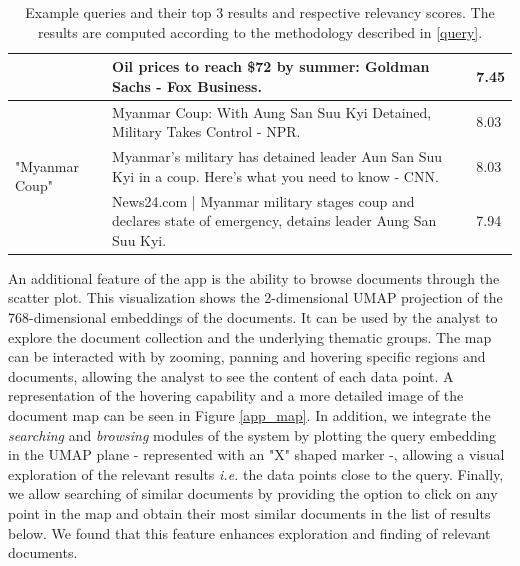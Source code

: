 \documentclass[a4paper]{article}
\begin{document}
\begin{table}[H]
{\begin{tabularx}{\linewidth}{lXl}
			                                          & Oil prices to reach \$72 by summer: Goldman Sachs - Fox Business.                                           & 7.45           \\  \midrule
			\multirow{3}{*}{"Myanmar Coup"}           & Myanmar Coup: With Aung San Suu Kyi Detained, Military Takes Control - NPR.                                 & 8.03           \\
			                                          & Myanmar's military has detained leader Aun San Suu Kyi in a coup. Here's what you need to know - CNN.       & 8.03           \\
			                                          & News24.com | Myanmar military stages coup and declares state of emergency, detains leader Aung San Suu Kyi. & 7.94           \\  \bottomrule
		\end{tabularx}%
	}
	\caption{Example queries and their top 3 results and respective relevancy scores. The results are computed according to the methodology described in \ref{query}.}
	\label{query_results}
\end{table}

An additional feature of the app is the ability to browse documents through the scatter plot. This visualization shows the 2-dimensional UMAP projection of the 768-dimensional embeddings of the documents. It can be used by the analyst to explore the document collection and the underlying thematic groups. The map can be interacted with by zooming, panning and hovering specific regions and documents, allowing the analyst to see the content of each data point. A representation of the hovering capability and a more detailed image of the document map can be seen in Figure \ref{app_map}. In addition, we integrate the \emph{searching} and \emph{browsing} modules of the system by plotting the query embedding in the UMAP plane - represented with an "X" shaped marker -, allowing a visual exploration of the relevant results \emph{i.e.} the data points close to the query. Finally, we allow searching of similar documents by providing the option to click on any point in the map and obtain their most similar documents in the list of results below. We found that this feature enhances exploration and finding of relevant documents.
\end{document}
